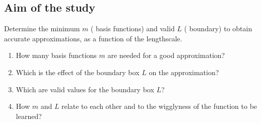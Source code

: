 \documentclass[8pt]{beamer} %
\begin{document}
\subsection*{Aim of the study}
\begin{frame}

\begin{tcolorbox}[colframe=blue!20, colback=white, title=\small Aim of the study, colbacktitle=lightblue, coltitle=black, boxrule=0.5pt]

Determine the minimum $m$ ({\color{navyblue} basis functions}) and valid $L$ ({\color{navyblue} boundary}) to obtain accurate approximations, as a function of the {\color{navyblue} lengthscale}.

\begin{enumerate}
\item How many basis functions $m$ are needed for a good approximation?

\item Which is the effect of the boundary box $L$ on the approximation?

\item Which are valid values for the boundary box $L$?

\item How $m$ and $L$ relate to each other and to the wigglyness of the function to be learned?
\end{enumerate}
\end{tcolorbox}
\end{frame}
\end{document}
